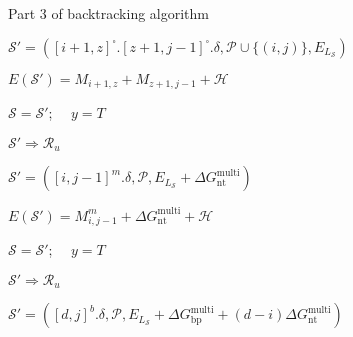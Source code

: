 \begin{algorithm}
	\caption*{Part 3 of backtracking algorithm}
	\begin{algorithmic}[1]
		\footnotesize
		
		
		
		
		\State  $\mathcal{S}' = ([i+1,z]^\square.[z+1,j-1]^\square.\delta, \mathcal{P} \cup \{(i,j)\}, E_{L_{\mathcal{S}}})$
		
		\State $E(\mathcal{S}')  = M_{i+1,z} +  M_{z+1,j-1} + \mathcal{H}$
		
		
		
		
		
		\State $\mathcal{S} = \mathcal{S}'$; \ \  $y = T$
		
		\Else
		
		\State $\mathcal{S}' \Rightarrow \mathcal{R}_u$		
		\EndIf
		\EndIf
		\EndFor
		
		\EndIf
		
		
		
		
		
		\State $\mathcal{S}' = ([i,j-1]^m.\delta, \mathcal{P}, E_{L_{\mathcal{S}}} + \Delta G_\text{nt}^\text{multi})$ 
		
		\State $E(\mathcal{S}')  = M_{i,j-1}^m + \Delta G_\text{nt}^\text{multi} + \mathcal{H}$
		
		
		
		
		
		\State $\mathcal{S} = \mathcal{S}'$; \ \  $y = T$
		
		\Else
		
		\State $\mathcal{S}' \Rightarrow \mathcal{R}_u$		
		\EndIf
		
		\EndIf
		
		\EndIf
		
		
		
		\State $\mathcal{S}' = ([d,j]^b.\delta, \mathcal{P}, E_{L_{\mathcal{S}}} + \Delta G_\text{bp}^\text{multi} + (d-i) \Delta G_\text{nt}^\text{multi})$ 
		

\end{algorithmic}
\end{algorithm}
